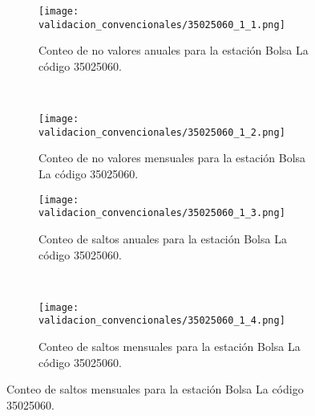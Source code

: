 \begin{figure}[H]\ContinuedFloat
\centering
	\begin{subfigure}[normla]{0.4\textwidth}
	\texttt{[image: validacion\_convencionales/35025060\_1\_1.png]}
		\caption{Conteo de no valores anuales para la estación Bolsa La código 35025060.}
		\label{subfig:a1}
		\end{subfigure}
		~
    \begin{subfigure}[normla]{0.4\textwidth}
	\texttt{[image: validacion\_convencionales/35025060\_1\_2.png]}
		\caption{Conteo de no valores mensuales para la estación Bolsa La código 35025060.}
		\label{subfig:a2}
		\end{subfigure}
		
    \begin{subfigure}[normla]{0.4\textwidth}
	\texttt{[image: validacion\_convencionales/35025060\_1\_3.png]}
		\caption{Conteo de saltos anuales para la estación Bolsa La código 35025060.}
		\label{subfig:a1}
		\end{subfigure}
		~
    \begin{subfigure}[normla]{0.4\textwidth}
	\texttt{[image: validacion\_convencionales/35025060\_1\_4.png]}
		\caption{Conteo de saltos mensuales para la estación Bolsa La código 35025060.}
		\label{subfig:a2}
		\end{subfigure}

\end{figure}
           
